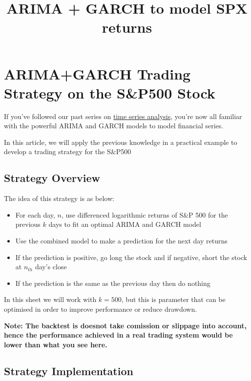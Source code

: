 \documentclass[11pt]{article}
\title{ARIMA + GARCH to model SPX returns}
\providecommand{\tightlist}{%
      \setlength{\itemsep}{0pt}\setlength{\parskip}{0pt}}
\begin{document}
    
    
    \maketitle
    
    

    
    \section{ARIMA+GARCH Trading Strategy on the S\&P500
Stock}\label{arimagarch-trading-strategy-on-the-sp500-stock}

If you've followed our past series on
\href{https://github.com/Auquan/Tutorials\#time-series-analysis}{time
series analysis}, you're now all familiar with the powerful ARIMA and
GARCH models to model financial series.

In this article, we will apply the previous knowledge in a practical
example to develop a trading strategy for the S\&P500

\subsection{Strategy Overview}\label{strategy-overview}

The idea of this strategy is as below:

\begin{itemize}
\tightlist
\item
  For each day, \(n\), use differenced logarithmic returns of S\&P 500
  for the previous \(k\) days to fit an optimal ARIMA and GARCH model
\item
  Use the combined model to make a prediction for the next day returns
\item
  If the prediction is positive, go long the stock and if negative,
  short the stock at \(n_{th}\) day's close
\item
  If the prediction is the same as the previous day then do nothing
\end{itemize}

In this sheet we will work with \(k=500\), but this is parameter that
can be optimised in order to improve performance or reduce drawdown.

\textbf{Note: The backtest is doesnot take comission or slippage into
account, hence the performance achieved in a real trading system would
be lower than what you see here.}

\subsection{Strategy Implementation}\label{strategy-implementation}
\end{document}
